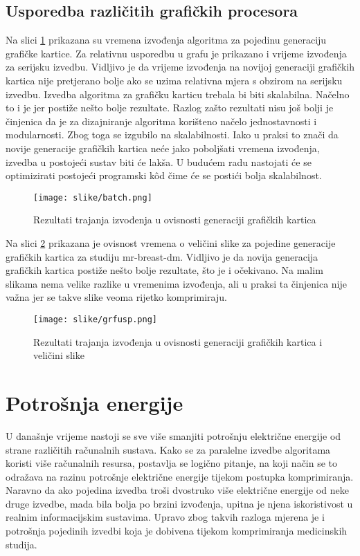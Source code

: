\documentclass[times, utf8, zavrsni, numeric, sort]{fer}
\begin{document}
\subsection{Usporedba različitih grafičkih procesora}
Na slici \ref{fig:verzija_kartica} prikazana su vremena izvođenja algoritma za pojedinu generaciju grafičke kartice. Za relativnu usporedbu u grafu je prikazano i vrijeme izvođenja za serijsku izvedbu. Vidljivo je da vrijeme izvođenja na novijoj generaciji grafičkih kartica nije pretjerano bolje ako se uzima relativna mjera s obzirom na serijsku izvedbu. Izvedba algoritma za grafičku karticu trebala bi biti skalabilna. Načelno to i je jer postiže nešto bolje rezultate. Razlog zašto rezultati nisu još bolji je činjenica da je za dizajniranje algoritma korišteno načelo jednostavnosti i modularnosti. Zbog toga se izgubilo na skalabilnosti. Iako u praksi to znači da novije generacije grafičkih kartica neće jako poboljšati vremena izvođenja, izvedba u postojeći sustav biti će lakša. U budućem radu nastojati će se optimizirati postojeći programski k\^{o}d čime će se postići bolja skalabilnost.

\begin{figure}[htb]
\centering
\texttt{[image: slike/batch.png]}
\caption{Rezultati trajanja izvođenja u ovisnosti generaciji grafičkih kartica}
\label{fig:verzija_kartica}
\end{figure}


Na slici \ref{fig:verzija_kartica_pixel_time} prikazana je ovisnost vremena o veličini slike za pojedine generacije grafičkih kartica za studiju mr-breast-dm. Vidljivo je da novija generacija grafičkih kartica postiže nešto bolje rezultate, što je i očekivano. Na malim slikama nema velike razlike u vremenima izvođenja, ali u praksi ta činjenica nije važna jer se takve slike veoma rijetko komprimiraju.

\begin{figure}[htb]
\centering
\texttt{[image: slike/grfusp.png]}
\caption{Rezultati trajanja izvođenja u ovisnosti generaciji grafičkih kartica i veličini slike}
\label{fig:verzija_kartica_pixel_time}
\end{figure}


\section{Potrošnja energije}

U današnje vrijeme nastoji se sve više smanjiti potrošnju električne energije od strane različitih računalnih sustava. Kako se za paralelne izvedbe algoritama koristi više računalnih resursa, postavlja se logično pitanje, na koji način se to odražava na razinu potrošnje električne energije tijekom postupka komprimiranja. Naravno da ako pojedina izvedba troši dvostruko više električne energije od neke druge izvedbe, mada bila bolja po brzini izvođenja, upitna je njena iskoristivost u realnim informacijskim sustavima. Upravo zbog takvih razloga mjerena je i potrošnja pojedinih izvedbi koja je dobivena tijekom komprimiranja medicinskih studija.
\end{document}
